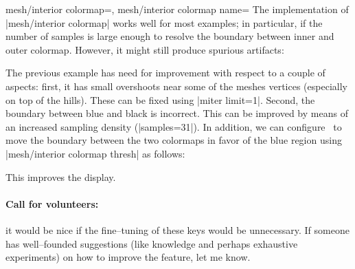{{\begin{pgfplotskeylist}{%
	mesh/interior colormap=,%
	mesh/interior colormap name=}
	The implementation of |mesh/interior colormap| works well for most examples; in particular, if the number of samples is large enough to resolve the boundary between inner and outer colormap. However, it might still produce spurious artifacts:
\pgfplotsexpensiveexample
\begin{codeexample}[]
\end{codeexample}
	\noindent The previous example has need for improvement with respect to a couple of aspects: first, it has small overshoots near some of the meshes vertices (especially on top of the hills). These can be fixed using |miter limit=1|. Second, the boundary between blue and black is incorrect. This can be improved by means of an increased sampling density (|samples=31|). In addition, we can configure \PGFPlots\ to move the boundary between the two colormaps in favor of the blue region using |mesh/interior colormap thresh| as follows:
\pgfplotsexpensiveexample
\begin{codeexample}[]
\end{codeexample}
	\noindent This improves the display.
	\paragraph{Call for volunteers:} it would be nice if the fine--tuning of these keys would be unnecessary. If someone has well--founded suggestions (like knowledge and perhaps exhaustive experiments) on how to improve the feature, let me know.


\end{pgfplotskeylist}}}
